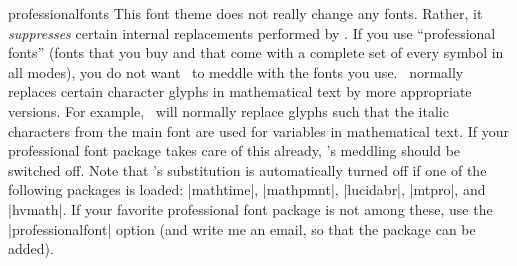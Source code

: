 \begin{fontthemeexample*}{professionalfonts}
  This font theme does not really change any fonts. Rather, it \emph{suppresses} certain internal replacements performed by \beamer. If you use ``professional fonts'' (fonts that you buy and that come with a complete set of every symbol in all modes), you do not want \beamer\ to meddle with the fonts you use. \beamer\ normally replaces certain character glyphs in mathematical text by more appropriate versions. For example, \beamer\ will normally replace glyphs such that the italic characters from the main font are used for variables in mathematical text. If your professional font package takes care of this already, \beamer's meddling should be switched off. Note that \beamer's substitution is automatically turned off if one of the following packages is loaded: |mathtime|, |mathpmnt|, |lucidabr|, |mtpro|, and |hvmath|. If your favorite professional font package is not among these, use the |professionalfont| option (and write me an email, so that the package can be added).
\end{fontthemeexample*}



